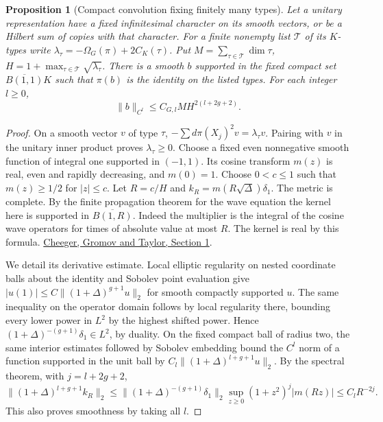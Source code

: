 \documentclass[a4paper,11pt]{article}
\newtheorem{proposition}{Proposition}[section]
\theoremstyle{definition}
\theoremstyle{remark}
\numberwithin{equation}{section}
\begin{document}
\begin{proposition}[Compact convolution fixing finitely many types]\leavevmode
\label{prop:kernel270}
Let a unitary representation have a fixed infinitesimal
character on its smooth vectors, or be a Hilbert sum of
copies with that character. For a finite nonempty list
\(\mathcal T\) of its \(K\)-types write
\(\lambda_\tau=-\Omega_G(\pi)+2C_K(\tau)\).
Put \(M=\sum_{\tau\in\mathcal T}\dim\tau\),
\(H=1+\max_{\tau\in\mathcal T}\sqrt{\lambda_\tau}\).
There is a smooth \(b\) supported in the fixed compact set
\(\overline{B(1,1)}K\) such that \(\pi(b)\) is the identity
on the listed types. For each integer \(l\ge0\),
\[
              \|b\|_{C^l}\le C_{G,l}M H^{2(l+2g+2)} .
\]
\end{proposition}
\begin{proof}
On a smooth vector \(v\) of type \(\tau\),
\(-\sum d\pi(X_j)^2v=\lambda_\tau v\). Pairing with \(v\)
in the unitary inner product proves \(\lambda_\tau\ge0\).
Choose a fixed even nonnegative smooth function of integral
one supported in \((-1,1)\). Its cosine transform \(m(z)\)
is real, even and rapidly decreasing, and \(m(0)=1\).
Choose \(0<c\le1\) such that \(m(z)\ge1/2\) for \(|z|\le c\).
Let \(R=c/H\) and \(k_R=m(R\sqrt\Delta)\delta_1\).
The metric is complete. By the finite propagation theorem
for the wave equation the kernel here is supported in
\(\overline{B(1,R)}\). Indeed the multiplier is the integral
of the cosine wave operators for times of absolute value
at most \(R\). The kernel is real by this formula.
\href{https://www.ihes.fr/~gromov/wp-content/uploads/2018/08/536.pdf}
{Cheeger, Gromov and Taylor, Section 1}.

We detail its derivative estimate. Local elliptic regularity
on nested coordinate balls about the identity and Sobolev
point evaluation give
\(
 |u(1)|\le C\|(1+\Delta)^{g+1}u\|_2
\)
for smooth compactly supported \(u\). The same inequality
on the operator domain follows by local regularity there,
bounding every lower power in \(L^2\) by the highest shifted
power. Hence \((1+\Delta)^{-(g+1)}\delta_1\in L^2\), by
duality. On the fixed compact ball of radius two, the same
interior estimates followed by Sobolev embedding bound the
\(C^l\) norm of a function supported in the unit ball by
\(C_l\|(1+\Delta)^{l+g+1}u\|_2\). By the spectral theorem,
with \(j=l+2g+2\),
\[
 \|(1+\Delta)^{l+g+1}k_R\|_2
 \le \|(1+\Delta)^{-(g+1)}\delta_1\|_2
       \sup_{z\ge0}(1+z^2)^j|m(Rz)|
 \le C_l R^{-2j}.
\]
This also proves smoothness by taking all \(l\).


\end{proof}
\end{document}

